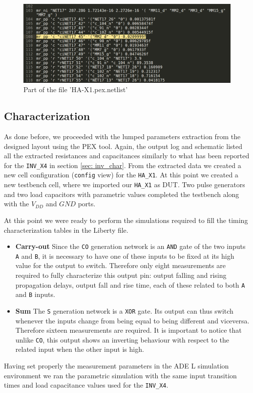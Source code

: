 \documentclass[a4paper]{article}
\newcommand{\inv}{\texttt{INV\_X4}\xspace}
\newcommand{\ha}{\texttt{HA\_X1}\xspace}
\begin{document}
\begin{figure}[H]
      \centering
       \includegraphics[width=12cm]{./Images/HA/HAX1_PEX_netlist.png}
\caption{Part of the file 'HA-X1.pex.netlist'}
\label{fig: PEX0_netlist}
\end{figure}


\subsection{Characterization}
As done before, we proceeded with the lumped parameters extraction from the designed layout using the PEX tool. Again, the output log and schematic listed all the extracted resistances and capacitances similarly to what has been reported for the \inv in section \ref{sec: inv_char}. From the extracted data we created a new cell configuration (\texttt{config} view) for the \ha. At this point we created a new testbench cell, where we imported our \ha as DUT. Two pulse generators and two load capacitors with parametric values completed the testbench along with the $V_{DD}$ and $GND$ ports.

At this point we were ready to perform the simulations required to fill the timing characterization tables in the Liberty file.
\begin{itemize}
	\item \textbf{Carry-out} Since the \texttt{CO} generation network is an \texttt{AND} gate of the two inputs \texttt{A} and \texttt{B}, it is necessary to have one of these inputs to be fixed at its high value for the output to switch. Therefore only eight measurements are required to fully characterize this output pin: output falling and rising propagation delays, output fall and rise time, each of these related to both \texttt{A} and \texttt{B} inputs.

	\item \textbf{Sum} The \texttt{S} generation network is a \texttt{XOR} gate. Its output can thus switch whenever the inputs change from being equal to being different and viceversa. Therefore sixteen measurements are required. It is important to notice that unlike \texttt{CO}, this output shows an inverting behaviour with respect to the related input when the other input is high.
\end{itemize}

Having set properly the measurement parameters in the ADE L simulation environment we ran the parametric simulation with the same input transition times and load capacitance values used for the \inv.
\end{document}

